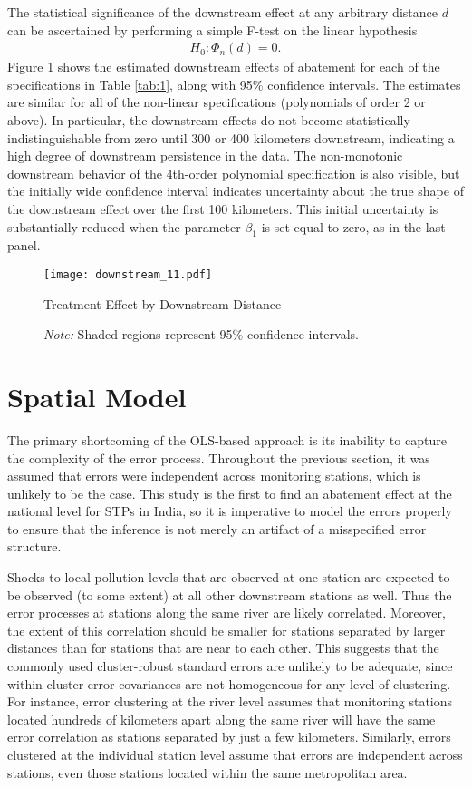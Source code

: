 \documentclass[12pt]{article}
\begin{document}
The statistical significance of the downstream effect at any arbitrary distance $d$ can be ascertained by performing a simple F-test on the linear hypothesis
\begin{align}
  H_0: \Phi_n(d) = 0.
\end{align} 
Figure \ref{fig:downstream} shows the estimated downstream effects of abatement for each of the specifications in Table \ref{tab:1}, along with 95\% confidence intervals. The estimates are similar for all of the non-linear specifications (polynomials of order 2 or above). In particular, the downstream effects do not become statistically indistinguishable from zero until 300 or 400 kilometers downstream, indicating a high degree of downstream persistence in the data. The non-monotonic downstream behavior of the 4th-order polynomial specification is also visible, but the initially wide confidence interval indicates uncertainty about the true shape of the downstream effect over the first 100 kilometers. This initial uncertainty is substantially reduced when the parameter $\beta_1$ is set equal to zero, as in the last panel.

\begin{figure}[t!] \centering 
	\texttt{[image: downstream\_11.pdf]}
	\caption{Treatment Effect by Downstream Distance}
	\label{fig:downstream}
        \caption*{\footnotesize \textit{Note:} Shaded regions represent 95\% confidence intervals.}
\end{figure}

\section{Spatial Model} \label{sec:spat}

The primary shortcoming of the OLS-based approach is its inability to capture the complexity of the error process. Throughout the previous section, it was assumed that errors were independent across monitoring stations, which is unlikely to be the case. This study is the first to find an abatement effect at the national level for STPs in India, so it is imperative to model the errors properly to ensure that the inference is not merely an artifact of a misspecified error structure. 

Shocks to local pollution levels that are observed at one station are expected to be observed (to some extent) at all other downstream stations as well. Thus the error processes at stations along the same river are likely correlated. Moreover, the extent of this correlation should be smaller for stations separated by larger distances than for stations that are near to each other. This suggests that the commonly used cluster-robust standard errors are unlikely to be adequate, since within-cluster error covariances are not homogeneous for any level of clustering. For instance, error clustering at the river level assumes that monitoring stations located hundreds of kilometers apart along the same river will have the same error correlation as stations separated by just a few kilometers. Similarly, errors clustered at the individual station level assume that errors are independent across stations, even those stations located within the same metropolitan area.
\end{document}
